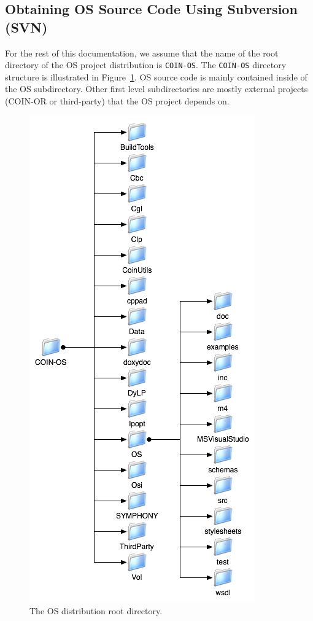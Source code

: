 \documentclass[11pt]{article}
\newcommand{\figurepath}{./figures}
\newcounter{Fig}
\renewcommand{\_}{{\char"5F}}
\renewcommand{\{}{{\char"7B}}
\renewcommand{\}}{{\char"7D}}
\renewcommand{\^}{{\char"0D}}
\renewcommand{\'}{{\char"0D}}
\begin{document}
\subsection{Obtaining OS Source Code Using Subversion (SVN)}\label{section:downloadwithsvn}

For the rest of this documentation, we assume that  the name of the root directory
of the OS project distribution is {\tt COIN-OS}.  
The {\tt COIN-OS} directory structure is illustrated in Figure~\ref{figure:osprojectrootdir}.
OS source code is mainly contained inside of the OS subdirectory. Other first level subdirectories are mostly
external projects (COIN-OR or third-party) that the OS project depends on.


\begin{figure}
\centering
\includegraphics[scale=0.7]{./figures/OSProjectRootDirectory.png}
\caption{The OS distribution root directory.}
\label{figure:osprojectrootdir}
\end{figure}
\end{document}
